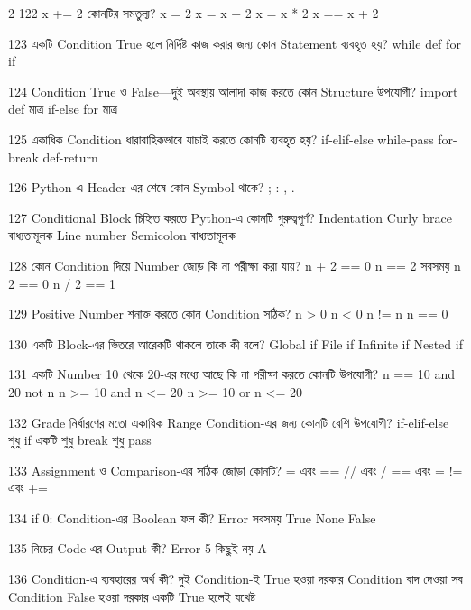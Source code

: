 \begin{multicols}{2}
\mcqwide
{122}
{\textenglish{\ttfamily x += 2} কোনটির সমতুল্য?}
{x = 2}
{x = x + 2}
{x = x * 2}
{x == x + 2}

\mcq
{123}
{একটি Condition True হলে নির্দিষ্ট কাজ করার জন্য কোন Statement ব্যবহৃত হয়?}
{while}
{def}
{for}
{if}

\mcq
{124}
{Condition True ও False—দুই অবস্থায় আলাদা কাজ করতে কোন Structure উপযোগী?}
{import}
{def মাত্র}
{if-else}
{for মাত্র}

\mcq
{125}
{একাধিক Condition ধারাবাহিকভাবে যাচাই করতে কোনটি ব্যবহৃত হয়?}
{if-elif-else}
{while-pass}
{for-break}
{def-return}

\mcq
{126}
{Python-এ  Header-এর শেষে কোন Symbol থাকে?}
{;}
{:}
{,}
{.}

\mcq
{127}
{Conditional Block চিহ্নিত করতে Python-এ কোনটি গুরুত্বপূর্ণ?}
{Indentation}
{Curly brace বাধ্যতামূলক}
{Line number}
{Semicolon বাধ্যতামূলক}

\mcq
{128}
{কোন Condition দিয়ে Number জোড় কি না পরীক্ষা করা যায়?}
{n + 2 == 0}
{n == 2 সবসময়}
{n  2 == 0}
{n / 2 == 1}

\mcq
{129}
{Positive Number শনাক্ত করতে কোন Condition সঠিক?}
{n > 0}
{n < 0}
{n != n}
{n == 0}

\mcq
{130}
{একটি  Block-এর ভিতরে আরেকটি  থাকলে তাকে কী বলে?}
{Global if}
{File if}
{Infinite if}
{Nested if}

\mcq
{131}
{একটি Number 10 থেকে 20-এর মধ্যে আছে কি না পরীক্ষা করতে কোনটি উপযোগী?}
{n == 10 and 20}
{not n}
{n >= 10 and n <= 20}
{n >= 10 or n <= 20}

\mcq
{132}
{Grade নির্ধারণের মতো একাধিক Range Condition-এর জন্য কোনটি বেশি উপযোগী?}
{if-elif-else}
{শুধু if একটি}
{শুধু break}
{শুধু pass}

\mcq
{133}
{Assignment ও Comparison-এর সঠিক জোড়া কোনটি?}
{= এবং ==}
{// এবং /}
{== এবং =}
{!= এবং +=}

\mcqwide
{134}
{\textenglish{\ttfamily if 0:} Condition-এর Boolean ফল কী?}
{Error সবসময়}
{True}
{None}
{False}

\mcqwide
{135}
{নিচের Code-এর Output কী?}
{Error}
{5}
{কিছুই নয়}
{A}

\mcqwide
{136}
{Condition-এ  ব্যবহারের অর্থ কী?}
{দুই Condition-ই True হওয়া দরকার}
{Condition বাদ দেওয়া}
{সব Condition False হওয়া দরকার}
{একটি True হলেই যথেষ্ট}


\end{multicols}

